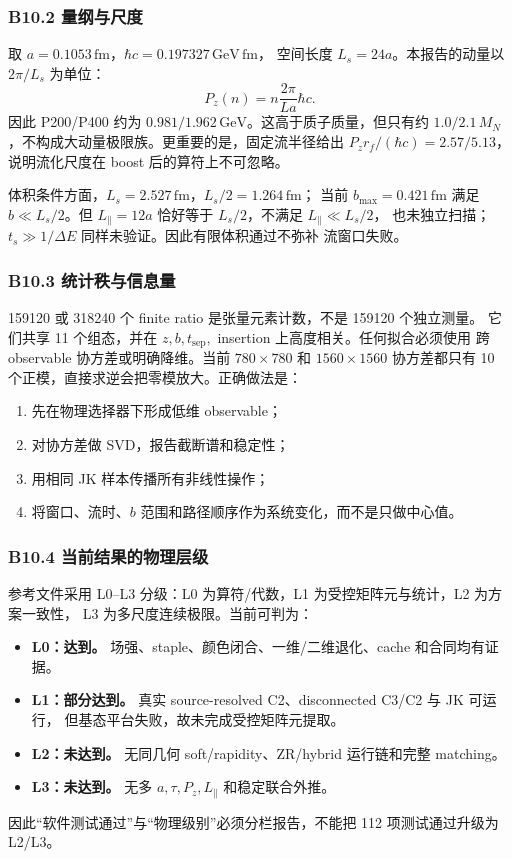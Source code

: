 \documentclass[UTF8]{ctexart}
\newcommand{\Pz}{P_z}
\newcommand{\ts}{t_{\mathrm{sep}}}
\begin{document}
\subsubsection{B10.2 量纲与尺度}

取 \(a=0.1053\,\mathrm{fm}\)，\(\hbar c=0.197327\,\mathrm{GeV\,fm}\)，
空间长度 \(L_s=24a\)。本报告的动量以 \(2\pi/L_s\) 为单位：
\begin{equation}
\Pz(n)=n\frac{2\pi}{La}\hbar c.
\label{eq:pz-physical}
\end{equation}
因此 P200/P400 约为 \(0.981/1.962\,\mathrm{GeV}\)。这高于质子质量，但只有约
\(1.0/2.1\,M_N\)，不构成大动量极限族。更重要的是，固定流半径给出
\(\Pz r_f/(\hbar c)=2.57/5.13\)，说明流化尺度在 boost 后的算符上不可忽略。

体积条件方面，\(L_s=2.527\,\mathrm{fm}\)，\(L_s/2=1.264\,\mathrm{fm}\)；
当前 \(b_{\max}=0.421\,\mathrm{fm}\) 满足 \(b\ll L_s/2\)。但
\(L_\parallel=12a\) 恰好等于 \(L_s/2\)，不满足 \(L_\parallel\ll L_s/2\)，
也未独立扫描；\(t_s\gg1/\Delta E\) 同样未验证。因此有限体积通过不弥补
流窗口失败。

\subsubsection{B10.3 统计秩与信息量}

159120 或 318240 个 finite ratio 是张量元素计数，不是 159120 个独立测量。
它们共享 11 个组态，并在 \(z,b,\ts,\) insertion 上高度相关。任何拟合必须使用
跨 observable 协方差或明确降维。当前 \(780\times780\) 和 \(1560\times1560\)
协方差都只有 10 个正模，直接求逆会把零模放大。正确做法是：
\begin{enumerate}
  \item 先在物理选择器下形成低维 observable；
  \item 对协方差做 SVD，报告截断谱和稳定性；
  \item 用相同 JK 样本传播所有非线性操作；
  \item 将窗口、流时、\(b\) 范围和路径顺序作为系统变化，而不是只做中心值。
\end{enumerate}

\subsubsection{B10.4 当前结果的物理层级}

参考文件采用 L0--L3 分级：L0 为算符/代数，L1 为受控矩阵元与统计，L2 为方案一致性，
L3 为多尺度连续极限。当前可判为：
\begin{itemize}
  \item \textbf{L0：达到。} 场强、staple、颜色闭合、一维/二维退化、cache 和合同均有证据。
  \item \textbf{L1：部分达到。} 真实 source-resolved C2、disconnected C3/C2 与 JK 可运行，
        但基态平台失败，故未完成受控矩阵元提取。
  \item \textbf{L2：未达到。} 无同几何 soft/rapidity、ZR/hybrid 运行链和完整 matching。
  \item \textbf{L3：未达到。} 无多 \(a,\tau,\Pz,L_\parallel\) 和稳定联合外推。
\end{itemize}
因此“软件测试通过”与“物理级别”必须分栏报告，不能把 112 项测试通过升级为 L2/L3。
\end{document}
